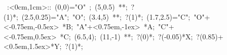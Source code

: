 
\hbox{
\xy    <1cm,0cm>:<0cm,1cm>::
       (0,0)="O" ; (5,0.5) **\dir{-};  ?(1)*\dir{>}; (2.5,0.25)="A";
       "O"; (3.4,5) **\dir{-};  ?(1)*\dir{>}; (1.7,2.5)="C";
       "O"+<-0.75em,-0.5ex> *{B};
       "A"+<0.75em,-1ex> *{A};
       "C"+<-0.75em,0.5ex> *{C};
       (6.5,4); (11,-1) **\dir{-}; ?(0)*{\bullet}; ?(-0.05)*{X}; 
       ?(0.85)+<0.5em,1.5ex>*{Y};  ?(1)*\dir{>}; 
\endxy}
	   
